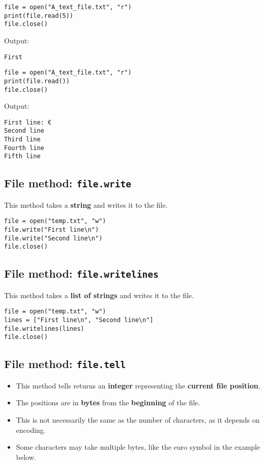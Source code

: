 \documentclass[11pt]{article}
\begin{document}
\begin{verbatim}
file = open("A_text_file.txt", "r")
print(file.read(5))
file.close()
\end{verbatim}

 \noindent Output:

\label{orgeac5b64}
\begin{verbatim}
First
\end{verbatim}


\begin{verbatim}
file = open("A_text_file.txt", "r")
print(file.read())
file.close()
\end{verbatim}

 \noindent Output:

\label{orgefa70be}
\begin{verbatim}
First line: €
Second line
Third line
Fourth line
Fifth line

\end{verbatim}
\subsection{File method: \texttt{file.write}}
\label{sec:org9a66bb1}
This method takes a \textbf{string} and writes it to the file.
\begin{verbatim}
file = open("temp.txt", "w")
file.write("First line\n")
file.write("Second line\n")
file.close()
\end{verbatim}
\subsection{File method: \texttt{file.writelines}}
\label{sec:orga255a6e}
This method takes a \textbf{list of strings} and writes it to the file.
\begin{verbatim}
file = open("temp.txt", "w")
lines = ["First line\n", "Second line\n"]
file.writelines(lines)
file.close()
\end{verbatim}
\subsection{File method: \texttt{file.tell}}
\label{sec:orgad7e5cc}
\begin{itemize}
\item This method tells returns an \textbf{integer} representing the \textbf{current file position}.
\item The positions are in \textbf{bytes} from the \textbf{beginning} of the file.
\item This is not necessarily the same as the number of characters, as it depends on encoding.
\item Some characters may take multiple bytes, like the euro symbol in the example below.
\end{itemize}
\end{document}
